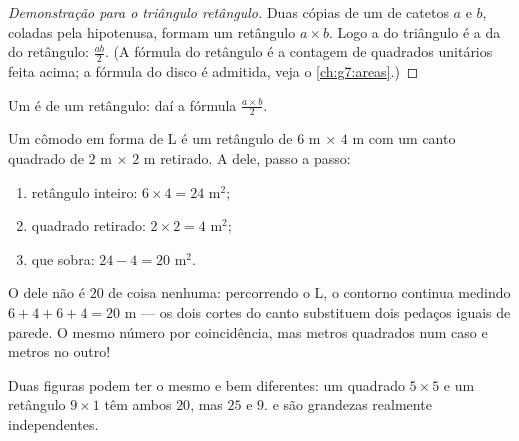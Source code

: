 \begin{proof}[Demonstração para o triângulo retângulo]
Duas cópias de um  de catetos $a$ e $b$, coladas
pela hipotenusa, formam um retângulo $a \times b$. Logo a  do
triângulo é a  da do retângulo: $\frac{ab}{2}$. (A fórmula do
retângulo é a contagem de quadrados unitários feita acima; a fórmula do
disco é admitida, veja o \cref{ch:g7:areas}.)
\end{proof}

\begin{omfigure}

{\small Um  é  de um retângulo: daí a fórmula
$\frac{a\times b}{2}$.}
\end{omfigure}

\begin{example}\label{ex:g6:measure:composite}
Um cômodo em forma de L é um retângulo de $6$ m $\times$ $4$ m com um
canto quadrado de $2$ m $\times$ $2$ m retirado. A  dele, passo a
passo:
\begin{enumerate}
  \item retângulo inteiro: $6 \times 4 = 24$ m$^2$;
  \item quadrado retirado: $2 \times 2 = 4$ m$^2$;
  \item {} que sobra: $24 - 4 = 20$ m$^2$.
\end{enumerate}
O \emph{} dele não é $20$ de coisa nenhuma: percorrendo o L, o
contorno continua medindo $6 + 4 + 6 + 4 = 20$ m --- os dois cortes do
canto substituem dois pedaços iguais de parede. O mesmo número por
coincidência, mas metros quadrados num caso e metros no outro!
\end{example}

\begin{remark}
Duas figuras podem ter o mesmo  e  bem diferentes: um
quadrado $5 \times 5$ e um retângulo $9 \times 1$ têm ambos 
$20$, mas  $25$ e $9$.  e  são grandezas realmente
independentes.
\end{remark}

